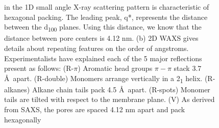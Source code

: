 \documentclass[journal=jpcbfk,manusciprt=article]{achemso}
\begin{document}
\begin{figure}[!htb]
{		in the 1D small angle X-ray scattering pattern is characteristic of hexagonal
		packing. The leading peak, q*, represents the distance between the
		d\textsubscript{100} planes. Using this distance, we know that the distance
		between pore centers is 4.12 nm. (b) 2D WAXS gives
		details about repeating features on the order of angstroms. Experimentalists
		have explained each of the 5 major reflections present as follows: (R-$\pi$) Aromatic
		head groups $\pi-\pi$ stack 3.7 \AA~apart. (R-double) Monomers arrange vertically in
		a 2\textsubscript{1} helix. (R-alkanes) Alkane chain tails pack 4.5 \AA~apart. (R-spots)
		Monomer tails are tilted with respect to the membrane plane. (V) As derived from
		SAXS, the pores are spaced 4.12 nm apart and pack hexagonally}
	\label{fig:SWAXS}
 \end{figure}
  
\end{document}
